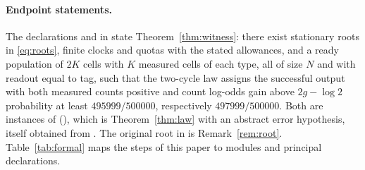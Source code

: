 \documentclass[11pt,a4paper]{article}
\theoremstyle{plain}
\theoremstyle{definition}
\theoremstyle{remark}
\begin{document}
\paragraph{Endpoint statements.}
The declarations  and  in  state Theorem~\ref{thm:witness}: there exist stationary roots in \eqref{eq:roots}, finite clocks and quotas with the stated allowances, and a ready population of $2K$ cells with $K$ measured cells of each type, all of size $N$ and with readout equal to tag, such that the two-cycle law assigns the successful output with both measured counts positive and count log-odds gain above $2g-\log2$ probability at least $495999/500000$, respectively $497999/500000$. Both are instances of  (), which is Theorem~\ref{thm:law} with an abstract error hypothesis, itself obtained from . The original root  in  is Remark~\ref{rem:root}. Table~\ref{tab:formal} maps the steps of this paper to modules and principal declarations.
\end{document}
